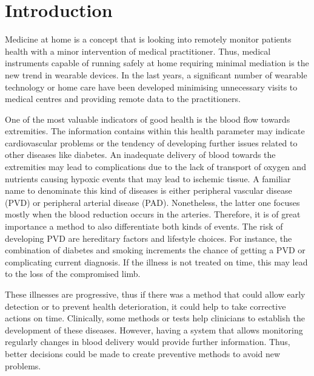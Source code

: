 
\chapter{Introduction}  %

\ifpdf
    \graphicspath{{Chapter1/Figs/Raster/}{Chapter1/Figs/PDF/}{Chapter1/Figs/}}
\else
    \graphicspath{{Chapter1/Figs/Vector/}{Chapter1/Figs/}}
\fi

Medicine at home is a concept that is looking into remotely monitor patients health with a minor intervention of medical practitioner. Thus, medical instruments capable of running safely at home requiring minimal mediation is the new trend in wearable devices. In the last years, a significant number of wearable technology or home care have been developed minimising unnecessary visits to medical centres and providing remote data to the practitioners.

One of the most valuable indicators of good health is the blood flow towards extremities. The information contains within this health parameter may indicate cardiovascular problems or the tendency of developing further issues related to other diseases like diabetes. An inadequate delivery of blood towards the extremities may lead to complications due to the lack of transport of oxygen and nutrients causing hypoxic events that may lead to ischemic tissue. A familiar name to denominate this kind of diseases is either peripheral vascular disease (PVD) or peripheral arterial disease (PAD). Nonetheless, the latter one focuses mostly when the blood reduction occurs in the arteries. Therefore, it is of great importance a method to also differentiate both kinds of events. The risk of developing PVD are hereditary factors and lifestyle choices. For instance, the combination of diabetes and smoking increments the chance of getting a PVD or complicating current diagnosis. If the illness is not treated on time, this may lead to the loss of the compromised limb.

These illnesses are progressive, thus if there was a method that could allow early detection or to prevent health deterioration, it could help to take corrective actions on time. Clinically, some methods or tests help clinicians to establish the development of these diseases. However, having a system that allows monitoring regularly changes in blood delivery would provide further information. Thus, better decisions could be made to create preventive methods to avoid new problems. 

